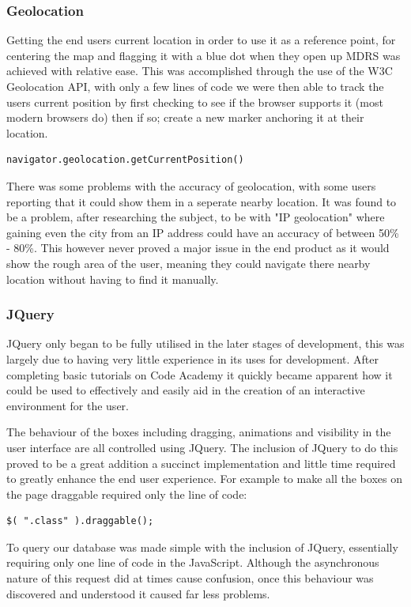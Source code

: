 \documentclass{l3proj}
\begin{document}
\subsubsection{Geolocation}		Getting the end users current location in order to use it as a reference point, for centering the map and flagging it with a blue dot when they open up MDRS was achieved with relative ease. This was accomplished through the use of the \gls{W3C} Geolocation \gls{API}, with only a few lines of code we were then able to track the users current position by first checking to see if the browser supports it (most modern browsers do) then if so; create a new marker anchoring it at their location.
\begin{verbatim}
navigator.geolocation.getCurrentPosition()
\end{verbatim}
There was some problems with the accuracy of geolocation, with some users reporting that it could show them in a seperate nearby location. It was found to be a problem, after researching the subject\cite{geolocation}, to be with "IP geolocation" where gaining even the city from an IP address could have an accuracy of between 50\% - 80\%. This however never proved a major issue in the end product as it would show the rough area of the user, meaning they could navigate there nearby location without having to find it manually.

\subsubsection{JQuery}		\gls{JQuery} only began to be fully utilised in the later stages of development, this was largely due to having very little experience in its uses for development. After completing basic tutorials on Code Academy\cite{codeacademy} it quickly became apparent how it could be used to effectively and easily aid in the creation of an interactive environment for the user.

The behaviour of the boxes including dragging, animations and visibility in the user interface are all controlled using JQuery. The inclusion of JQuery to do this proved to be a great addition a succinct implementation and little time required to greatly enhance the end user experience. For example to make all the boxes on the page draggable required only the line of code:
\begin{verbatim}
$( ".class" ).draggable();
\end{verbatim}
To query our database was made simple with the inclusion of JQuery, essentially requiring only one line of code in the \gls{JavaScript}. Although the asynchronous nature of this request did at times cause confusion, once this behaviour was discovered and understood it caused far less problems.
\end{document}
